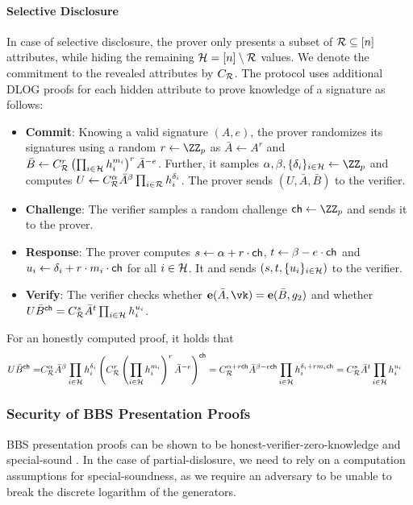 \paragraph{Selective Disclosure}{
    In case of selective disclosure, the prover only presents a subset of $\mathcal{R}\subseteq[n]$ attributes, while hiding the remaining $\mathcal{H}=[n]\setminus\mathcal{R}$ values. We denote the commitment to the revealed attributes by $C_{\mathcal{R}}$. The protocol uses additional DLOG proofs for each hidden attribute to prove knowledge of a signature as follows:
    \begin{itemize}
        \item \textbf{Commit}: Knowing a valid signature $(A,e)$, the prover randomizes its signatures using a random $r\gets \ZZ_p$ as $\bar{A} \gets A^r$ and $\bar{B} \gets C_{\mathcal{R}}^r\left(\prod_{i\in\mathcal{H}}h_i^{m_i}\right)^r \bar{A}^{-e}$. Further, it samples $\alpha,\beta,\{\delta_i\}_{i\in\hidden}\gets \ZZ_p$ and computes $U \gets C_{\mathcal{R}}^{\alpha} \bar{A}^{\beta}\prod_{i\in\mathcal{R}}h_i^{\delta_i}$. The prover sends $(U,\bar{A},\bar{B})$ to the verifier.
        \item \textbf{Challenge}: The verifier samples a random challenge $\chall\gets \ZZ_p$ and sends it to the prover.
        \item \textbf{Response}: The prover computes $s\gets \alpha +r\cdot \mathsf{ch}$, $t\gets\beta-e\cdot \mathsf{ch}$ and $u_i\gets \delta_i+r\cdot m_i\cdot \mathsf{ch}$ for all $i\in\mathcal{H}$. It and sends $(s,t,\{u_i\}_{i\in\mathcal{H}})$ to the verifier.
        \item \textbf{Verify}: The verifier checks whether $\pairing(\bar{A},\vk) = \pairing(\bar{B},g_2)$ and whether $U \bar{B}^{\mathsf{ch}} = C_{\mathcal{R}}^s \bar{A}^t\prod_{i\in\mathcal{H}}h_i^{u_i}$.
    \end{itemize}
    For an honestly computed proof, it holds that 
    \begin{align*}
        U \bar{B}^{\mathsf{ch}}
        =& C_{\mathcal{R}}^{\alpha} \bar{A}^{\beta} \prod_{i\in\mathcal{H}}h_i^{\delta_i} \left(C_{\mathcal{R}}^r\left(\prod_{i\in\mathcal{H}}h_i^{m_i}\right)^r\bar{A}^{-e}\right)^{\mathsf{ch}}
        = C_{\mathcal{R}}^{\alpha + r \mathsf{ch}} \bar{A}^{\beta - e \mathsf{ch}} \prod_{i\in\mathcal{H}}h_i^{\delta_i+ r m_i \mathsf{ch}} 
        = C_{\mathcal{R}}^s \bar{A}^t \prod_{i\in\mathcal{H}}h_i^{u_i}  
    \end{align*}
}


\subsubsection{Security of BBS Presentation Proofs} \label{sec:prelims:bbs_pres_sec}
BBS presentation proofs can be shown to be honest-verifier-zero-knowledge and special-sound \cite{DBLP:conf/eurocrypt/TessaroZ23a}. In the case of partial-dislosure, we need to rely on a computation assumptions for special-soundness, as we require an adversary to be unable to break the discrete logarithm of the generators.